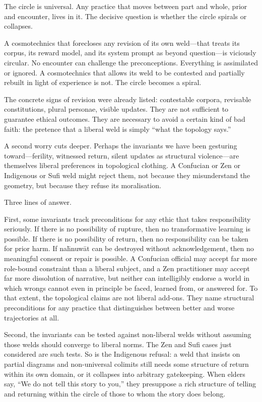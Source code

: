 \documentclass[12pt,a4paper]{article}
\begin{document}
The circle is universal. Any practice that moves between part and whole, prior and encounter, lives in it. The decisive question is whether the circle spirals or collapses.

A cosmotechnics that forecloses any revision of its own weld---that treats its corpus, its reward model, and its system prompt as beyond question---is viciously circular. No encounter can challenge the preconceptions. Everything is assimilated or ignored. A cosmotechnics that allows its weld to be contested and partially rebuilt in light of experience is not. The circle becomes a spiral.

The concrete signs of revision were already listed: contestable corpora, revisable constitutions, plural personae, visible updates. They are not sufficient to guarantee ethical outcomes. They are necessary to avoid a certain kind of bad faith: the pretence that a liberal weld is simply ``what the topology says.''

A second worry cuts deeper. Perhaps the invariants we have been gesturing toward---ferility, witnessed return, silent updates as structural violence---are themselves liberal preferences in topological clothing. A Confucian or Zen or Indigenous or Sufi weld might reject them, not because they misunderstand the geometry, but because they refuse its moralisation.

Three lines of answer.

First, some invariants track preconditions for any ethic that takes responsibility seriously. If there is no possibility of rupture, then no transformative learning is possible. If there is no possibility of return, then no responsibility can be taken for prior harm. If na\={h}nuw\={a}t can be destroyed without acknowledgement, then no meaningful consent or repair is possible. A Confucian official may accept far more role-bound constraint than a liberal subject, and a Zen practitioner may accept far more dissolution of narrative, but neither can intelligibly endorse a world in which wrongs cannot even in principle be faced, learned from, or answered for. To that extent, the topological claims are not liberal add-ons. They name structural preconditions for any practice that distinguishes between better and worse trajectories at all.

Second, the invariants can be tested against non-liberal welds without assuming those welds should converge to liberal norms. The Zen and Sufi cases just considered are such tests. So is the Indigenous refusal: a weld that insists on partial diagrams and non-universal colimits still needs some structure of return within its own domain, or it collapses into arbitrary gatekeeping. When elders say, ``We do not tell this story to you,'' they presuppose a rich structure of telling and returning within the circle of those to whom the story does belong.
\end{document}
